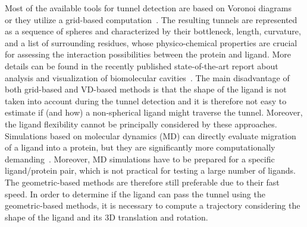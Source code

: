 \documentclass[usletter, 10pt, conference]{ieeeconf} %
\def\C{\mathcal{C}}
\begin{document}
Most of the available tools for tunnel detection are based on Voronoi diagrams~\cite{yaffe2008,caver3} or they utilize a grid-based computation~\cite{sehnal2013mole}.
The resulting tunnels are represented as a sequence of spheres and characterized by their bottleneck, length, curvature, and a list of surrounding residues, whose physico-chemical properties are crucial for assessing the interaction possibilities between the protein and ligand.
More details can be found in the recently published state-of-the-art report about analysis and visualization of biomolecular cavities~\cite{Krone_2016}.
The main disadvantage of both grid-based and VD-based methods is that the shape of the ligand is not taken into account during the tunnel detection and it is therefore not easy to estimate if (and how) a non-spherical ligand might traverse the tunnel.
Moreover, the ligand flexibility cannot be principally considered by these approaches.
Simulations based on molecular dynamics (MD) can directly evaluate migration of a ligand into a protein, but they are significantly more computationally demanding~\cite{kingsley2014including}. 
Moreover, MD simulations have to be prepared for a specific ligand/protein pair, which is not practical for testing a large number of ligands.
The geometric-based methods are therefore still preferable due to their fast speed.
In order to determine if the ligand can pass the tunnel using the geometric-based methods, it is necessary to compute a trajectory considering the shape of the ligand and its 3D translation and rotation.

\end{document}
